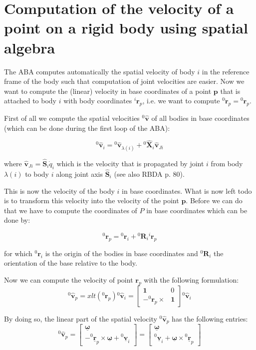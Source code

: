 \documentclass[a4paper]{article}
\newcommand{\Spa}[1]{\mathbf{\hat{#1}}}
\newcommand{\Nspa}[1]{\mathbf{\underline{#1}}}
\newcommand{\Vec}[1]{\mathbf{#1}}
\begin{document}
\section{Computation of the velocity of a point on a rigid body using spatial
algebra}

The ABA computes automatically the spatial velocity of body $i$ in the
reference frame of the body such that computation of joint velocities are
easier. Now we want to compute the (linear) velocity in base coordinates of a
point $\Vec{p}$ that is attached to body $i$ with body coordinates
${}^i\Vec{r}_p$, i.e. we want to compute ${}^0 \Vec{\dot{r}}_p = {}^0
\Vec{r}_p$.

First of all we compute the spatial velocities ${}^0\Spa{v}$ of all bodies in
base coordinates (which can be done during the first loop of the ABA):

\begin{equation}
	{}^0\Spa{v}_i = {}^0\Spa{v}_{\lambda(i)} + {}^{0}\Spa{X}_{i} \Spa{v}_{Ji}
\end{equation}

where $\Spa{v}_{Ji} = \Spa{S}_i \dot{q}_i $ which is the velocity that is
propagated by joint $i$ from body $\lambda(i)$ to body $i$ along joint axis
$\Spa{S}_i$ (see also RBDA p. 80).

This is now the velocity of the body $i$ in base coordinates. What is now left
todo is to transform this velocity into the velocity of the point $\Vec{p}$.
Before we can do that we have to compute the coordinates of $P$ in base
coordinates which can be done by:

\begin{equation}
	{}^0\Vec{r}_p = {}^0 \Vec{r}_i + {}^0\Vec{R}_i {}^i \Vec{r}_p
\end{equation}

for which ${}^0 \Vec{r}_i$ is the origin of the bodies in base coordinates and
${}^0 \Vec{R}_i$ the orientation of the base relative to the body.

Now we can compute the velocity of point $\Vec{r}_p$ with the following
formulation:
\begin{equation}
	{}^0\Spa{v}_p = \textit{xlt}({}^0\Vec{r}_p) {}^0\Spa{v}_i =
	\left[
	\begin{array}{cc}
		\Vec{1} & 0 \\
		-{}^0\Vec{r}_p \times & \Vec{1}
	\end{array}
	\right]
	{}^0\Spa{v}_i
\end{equation}

By doing so, the linear part of the spatial velocity ${}^0\Spa{v}_p$ has the
following entries:
\begin{equation}
	{}^0\Spa{v}_p = \left[
	\begin{array}{c}
		\Nspa{\omega} \\
		-{}^0\Nspa{r}_p \times \Nspa{\omega} + {}^0 \Nspa{\Vec{v}}_i
	\end{array}
	\right]
	=
	\left[
	\begin{array}{c}
		\Nspa{\omega} \\
		{}^0 \Nspa{\Vec{v}}_i + \Nspa{\omega} \times {}^0 \Nspa{r}_p
	\end{array}
	\right]
\end{equation}
\end{document}
